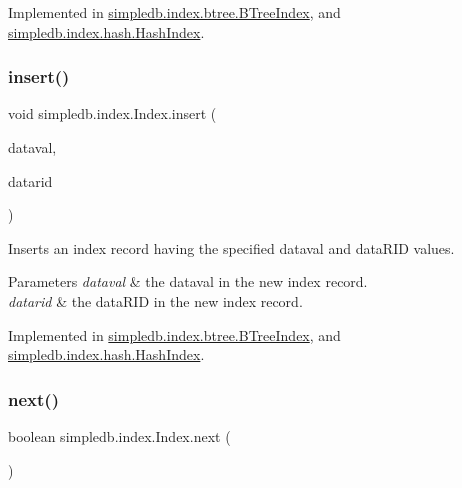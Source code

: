 Implemented in \hyperlink{classsimpledb_1_1index_1_1btree_1_1BTreeIndex_a842091f8c02f9d3009f634c5c0635b4f}{simpledb.\+index.\+btree.\+B\+Tree\+Index}, and \hyperlink{classsimpledb_1_1index_1_1hash_1_1HashIndex_ae8318b51f79a93009bcf9806aacda405}{simpledb.\+index.\+hash.\+Hash\+Index}.

\mbox{\label{interfacesimpledb_1_1index_1_1Index_a7e72ba9fe47d6d7631e0ad3feee882d7}} 
\subsubsection{\texorpdfstring{insert()}{insert()}}
{\footnotesize\ttfamily void simpledb.\+index.\+Index.\+insert (\begin{DoxyParamCaption}\item[{\hyperlink{classsimpledb_1_1query_1_1Constant}{Constant}}]{dataval,  }\item[{\hyperlink{classsimpledb_1_1record_1_1RID}{R\+ID}}]{datarid }\end{DoxyParamCaption})}

Inserts an index record having the specified dataval and data\+R\+ID values. 
\begin{DoxyParams}{Parameters}
{\em dataval} & the dataval in the new index record. \\
\hline
{\em datarid} & the data\+R\+ID in the new index record. \\
\hline
\end{DoxyParams}


Implemented in \hyperlink{classsimpledb_1_1index_1_1btree_1_1BTreeIndex_a74ac0fcec24483159ab82ac47d7bc790}{simpledb.\+index.\+btree.\+B\+Tree\+Index}, and \hyperlink{classsimpledb_1_1index_1_1hash_1_1HashIndex_a8fd2cc37db3d7b254658fdd4b2814f40}{simpledb.\+index.\+hash.\+Hash\+Index}.

\mbox{\label{interfacesimpledb_1_1index_1_1Index_a38b2addb6813fbf1d94e77de2345724c}} 
\subsubsection{\texorpdfstring{next()}{next()}}
{\footnotesize\ttfamily boolean simpledb.\+index.\+Index.\+next (\begin{DoxyParamCaption}{ }\end{DoxyParamCaption})}

